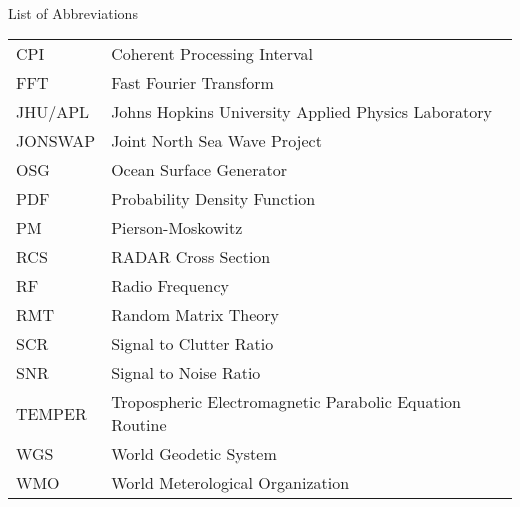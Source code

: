 

\renewcommand{\baselinestretch}{1}
\small\normalsize
\hbox{\ }

\vspace{-4em}

\begin{center}
\large{List of Abbreviations}
\end{center} 

\vspace{3pt}

\begin{supertabular}{ll}
CPI & Coherent Processing Interval \\
FFT & Fast Fourier Transform \\
JHU/APL & Johns Hopkins University Applied Physics Laboratory \\
JONSWAP & Joint North Sea Wave Project\\
OSG & Ocean Surface Generator \\
PDF & Probability Density Function \\
PM & Pierson-Moskowitz \\
RCS & RADAR Cross Section \\
RF & Radio Frequency \\
RMT & Random Matrix Theory \\
SCR & Signal to Clutter Ratio \\
SNR & Signal to Noise Ratio\\
TEMPER & Tropospheric Electromagnetic Parabolic Equation Routine \\
WGS & World Geodetic System \\
WMO & World Meterological Organization \\
\end{supertabular}
